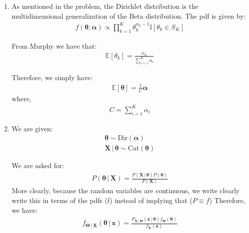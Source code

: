 \documentclass[submit]{harvardml}
\newcommand{\given}{\,|\,}
\newcommand{\E}{\mathbb{E}}
\newcommand{\D}{\text{Dir}}
\newcommand{\Cat}{\text{Cat}}
\renewcommand{\v}{\boldsymbol}
\begin{document}
\begin{enumerate}[label=(\alph*)]
	\item As mentioned in the problem, the Dirichlet distribution is the multidimensional generalization of the Beta distribution. The pdf is given by:
	\begin{align}
		f(\boldsymbol{\theta}; \v{\alpha}) \propto \prod_{k=1}^{K} \theta_k^{\alpha_k - 1} \mathbb{I}\left[\theta_k \in S_K \right]
	\end{align}
	
	From Murphy we have that:
	\begin{align*}
	\E\left[\theta_k\right] = \frac{\alpha_k}{\sum_{i=1}^K{\alpha_i} }
	\end{align*}
	
	Therefore, we simply have:
	\begin{align}
		\E \left[ \v{\theta} \right] = \frac{1}{C} \v{\alpha} 
	\end{align}
	where, 
	\begin{align}
		C = \sum_{i=1}^K{\alpha_i}
	\end{align}
	
	\item We are given:
		\begin{align*}
			\v{\theta} \sim \D(\v{\alpha}) \\
			\v{X} \given \v{\theta} \sim \Cat(\v{\theta})
		\end{align*}
		
		We are asked for: 
		\begin{align*}
		P(\v{\theta} \given \v{X}) = \frac{P(\v{X} \given \v{\theta}) P(\v{\theta})}{P(\v{X})}
		\end{align*}
		More clearly, because the random variables are continuous, we write clearly write this in terms of the pdfs (f) instead of implying that ($P \equiv f$)
		Therefore, we have:
		\begin{align*}
			f_{\v{\Theta} \given \v{X}} (\v{\theta} \given \v{x}) = \frac{P_{\v{X} \given \v{\Theta}}(\v{x} \given \v{\theta}) f_{\v{\Theta}}(\v{\theta})}{f_{\v{X}}(\v{x})}
		\end{align*}
		

\end{enumerate}
\end{document}
